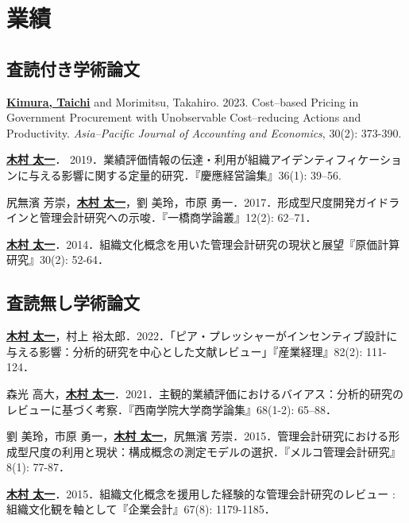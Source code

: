 \documentclass[letterpaper,uplatex]{article}
\renewenvironment{itemize}{
  \begin{list}{}{
    \setlength{\leftmargin}{1.5em}
  }
}{
  \end{list}
}
\begin{document}
\section*{業績}

\subsection*{査読付き学術論文}

\begin{itemize}
    \item \underline{\textbf{Kimura, Taichi}} and Morimitsu, Takahiro. 2023. Cost--based Pricing in Government Procurement with Unobservable Cost--reducing Actions and Productivity. \textit{Asia--Pacific Journal of Accounting and Economics}, 30(2): 373-390.
    
    \item \underline{\textbf{木村 太一}}． 2019．業績評価情報の伝達・利用が組織アイデンティフィケーションに与える影響に関する定量的研究．『慶應経営論集』36(1): 39--56.

	\item 尻無濱 芳崇，\underline{\textbf{木村 太一}}，劉 美玲，市原 勇一．2017．形成型尺度開発ガイドラインと管理会計研究への示唆．『一橋商学論叢』12(2): 62--71．

	\item \underline{\textbf{木村 太一}}．2014．組織文化概念を用いた管理会計研究の現状と展望『原価計算研究』30(2): 52-64．
\end{itemize}

\subsection*{査読無し学術論文}

\begin{itemize}
    \item \underline{\textbf{木村 太一}}，村上 裕太郎．2022．「ピア・プレッシャーがインセンティブ設計に与える影響：分析的研究を中心とした文献レビュー」『産業経理』82(2): 111-124．

    \item 森光 高大，\underline{\textbf{木村 太一}}．2021．主観的業績評価におけるバイアス：分析的研究のレビューに基づく考察．『西南学院大学商学論集』68(1-2): 65--88．
    
	\item 劉 美玲，市原 勇一，\underline{\textbf{木村 太一}}，尻無濱 芳崇．2015．管理会計研究における形成型尺度の利用と現状：構成概念の測定モデルの選択．『メルコ管理会計研究』8(1): 77-87．

	\item \underline{\textbf{木村 太一}}．2015．組織文化概念を援用した経験的な管理会計研究のレビュー : 組織文化観を軸として『企業会計』67(8): 1179-1185．
\end{itemize}
\end{document}
